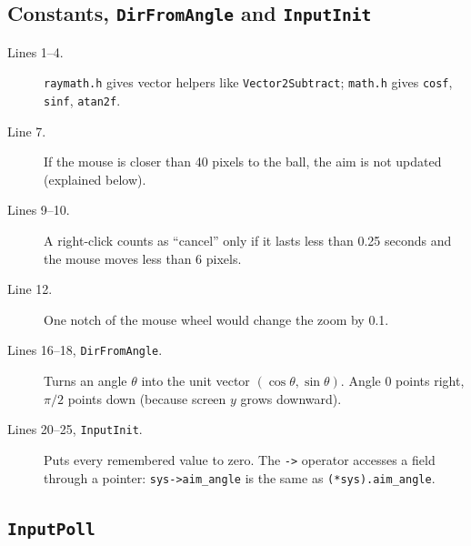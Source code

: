 \documentclass[11pt,a4paper]{article}
\newcommand{\code}[3]{}
\begin{document}
\subsection{Constants, \texttt{DirFromAngle} and \texttt{InputInit}}

\code{input.c}{1}{25}

\begin{description}
  \item[Lines 1--4.] \texttt{raymath.h} gives vector helpers like \texttt{Vector2Subtract}; \texttt{math.h} gives
  \texttt{cosf}, \texttt{sinf}, \texttt{atan2f}.
  \item[Line 7.] If the mouse is closer than 40 pixels to the ball, the aim is not updated (explained below).
  \item[Lines 9--10.] A right-click counts as ``cancel'' only if it lasts less than 0.25 seconds and the mouse
  moves less than 6 pixels.
  \item[Line 12.] One notch of the mouse wheel would change the zoom by 0.1.
  \item[Lines 16--18, \texttt{DirFromAngle}.] Turns an angle $\theta$ into the unit vector $(\cos\theta, \sin\theta)$.
  Angle 0 points right, $\pi/2$ points down (because screen $y$ grows downward).
  \item[Lines 20--25, \texttt{InputInit}.] Puts every remembered value to zero. The \texttt{->} operator
  accesses a field through a pointer: \texttt{sys->aim\_angle} is the same as \texttt{(*sys).aim\_angle}.
\end{description}

\subsection{\texttt{InputPoll}}\label{sec:inputpoll}

\code{input.c}{27}{70}
\end{document}
